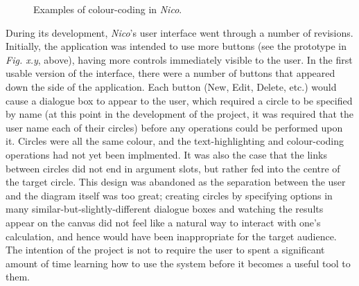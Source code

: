\documentclass[12pt,twoside,notitlepage,xetex]{report}
\begin{document}
\begin{center}
\begin{figure}[H]
\begin{center}
{}\hspace{2cm}
\end{center}
\caption{Examples of colour-coding in \emph{Nico}.}
\end{figure}
\end{center}

During its development, \emph{Nico}'s user interface went through a number of
revisions.  Initially, the application was intended to use more buttons (see
the prototype in \emph{Fig. x.y}, above), having more controls immediately
visible to the user.  In the first usable version of the interface, there were
a number of buttons that appeared down the side of the application.  Each
button ({\sfapp New}, {\sfapp Edit}, {\sfapp Delete}, etc.) would cause a
dialogue box to appear to the user, which required a circle to be specified by
name (at this point in the development of the project, it was required that the
user name each of their circles) before any operations could be performed upon
it.  Circles were all the same colour, and the text-highlighting and
colour-coding operations had not yet been implmented.  It was also the case
that the links between circles did not end in argument slots, but rather fed
into the centre of the target circle.  This design was abandoned as the
separation between the user and the diagram itself was too great; creating
circles by specifying options in many similar-but-slightly-different dialogue
boxes and watching the results appear on the canvas did not feel like a natural
way to interact with one's calculation, and hence would have been inappropriate
for the target audience.  The intention of the project is not to require the
user to spent a significant amount of time learning how to use the system
before it becomes a useful tool to them.
\end{document}
